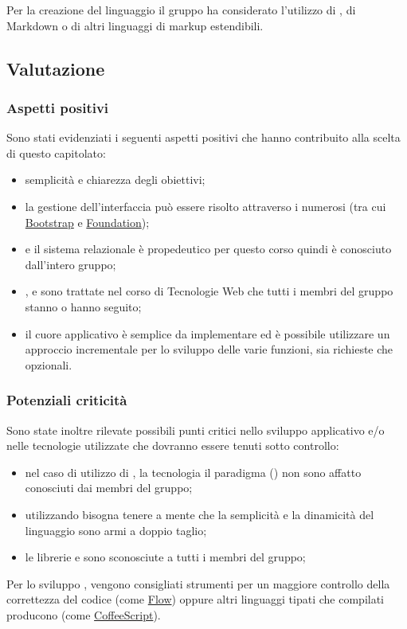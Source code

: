 \documentclass[12pt,a4paper]{article}
\begin{document}
Per la creazione del linguaggio  il gruppo ha considerato l'utilizzo di , di Markdown o di altri linguaggi di markup estendibili.

\subsection{Valutazione}
\subsubsection{Aspetti positivi}

Sono stati evidenziati i seguenti aspetti positivi che hanno contribuito alla scelta di questo capitolato:

\begin{itemize}
\item semplicità e chiarezza degli obiettivi;
\item la gestione dell'interfaccia  può essere risolto attraverso i numerosi  (tra cui \href{http://getbootstrap.com}{Bootstrap} e \href{http://foundation.zurb.com}{Foundation});
\item {} e il sistema relazionale è propedeutico per questo corso quindi è conosciuto dall'intero gruppo;
\item {},  e  sono trattate nel corso di Tecnologie Web che tutti i membri del gruppo stanno o hanno
seguito;
\item il cuore applicativo è semplice da implementare ed è possibile utilizzare un approccio incrementale per lo sviluppo delle varie funzioni, sia richieste che opzionali.
\end{itemize}

\subsubsection{Potenziali criticità}

Sono state inoltre rilevate possibili punti critici nello sviluppo applicativo e/o nelle tecnologie utilizzate che dovranno essere tenuti sotto controllo:

\begin{itemize}
\item nel caso di utilizzo di , la tecnologia il paradigma () non sono affatto conosciuti dai membri del gruppo;
\item utilizzando  bisogna tenere a mente che la semplicità e la dinamicità del linguaggio sono armi a doppio taglio;
\item le librerie  e  sono sconosciute a tutti i membri del gruppo;
\end{itemize}
Per lo sviluppo , vengono consigliati strumenti per un maggiore controllo della correttezza del codice (come \href{http://flowtype.org}{Flow}) oppure altri linguaggi tipati che compilati producono  (come \href{http://coffeescript.org}{CoffeeScript}).
\end{document}
